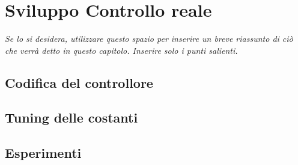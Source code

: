 \chapter{Sviluppo Controllo reale}\label{controlDevelop}

\begin{minipage}{12cm}\textit{Se lo si desidera, utilizzare questo spazio per inserire un breve riassunto di ci\`o che verr\`a detto in questo capitolo. Inserire solo i punti salienti.}
\end{minipage}

\vspace*{1cm}

\section{Codifica del controllore}

\section{Tuning delle costanti}

\section{Esperimenti}
